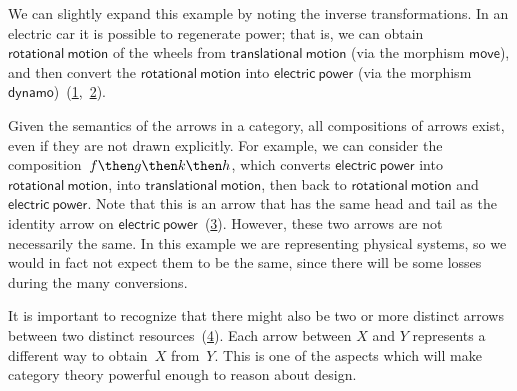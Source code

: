We can slightly expand this example by noting the inverse transformations. In an electric car
it is possible to regenerate power; that is, we can obtain $\mathsf{rotational}\ \mathsf{motion}$ of the wheels from
$\mathsf{translational}\ \mathsf{motion}$ (via the morphism $\mathsf{move}$), and then convert the $\mathsf{rotational}\ \mathsf{motion}$ into $\mathsf{electric}\ \mathsf{power}$ (via the morphism $\mathsf{dynamo}$)~(\cref{fig:e6},~\cref{fig:e6-together}).


\begin{figure}[h!]
    \centering
    \caption{\label{fig:e6}}
\end{figure}

\begin{figure}[h!]
    \centering
    \caption{\label{fig:e6-together}}
\end{figure}
Given the semantics of the arrows in a category, all compositions of arrows exist, even if they are not drawn
explicitly. For example, we can consider the composition~$f\then g \then k \then h$, which
converts $\mathsf{electric}\ \mathsf{power}$ into $\mathsf{rotational}\ \mathsf{motion}$, into $\mathsf{translational}\ \mathsf{motion}$, then back to
$\mathsf{rotational}\ \mathsf{motion}$ and $\mathsf{electric}\ \mathsf{power}$. Note that this is an arrow that has the same head and tail as the identity arrow on $\mathsf{electric}\ \mathsf{power}$~(\cref{fig:e8}). However, these two arrows are not necessarily the same. In this example we are representing physical systems, so we would in fact not expect them to be the same, since there will be some losses during the many conversions.

\begin{figure}[h!]
    \centering
    \caption{\label{fig:e8}}
\end{figure}

It is important to recognize that there might also be two or more distinct arrows between two distinct resources~(\cref{fig:e9}). Each arrow between $X$ and $Y$ represents a different way  to obtain~$X$ from~$Y$. This is one of the aspects which will make category theory powerful enough to reason about design.

\begin{figure}[h!]
    \centering
    \caption{\label{fig:e9}}
\end{figure}

